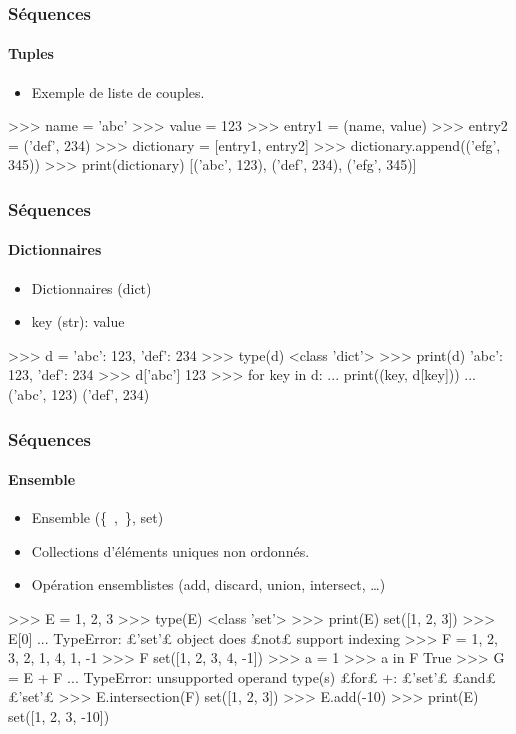 \begin{frame}[fragile]
\frametitle{Séquences}
\framesubtitle{Tuples}
\begin{itemize}
 \item Exemple de liste de couples. 
\end{itemize}
\begin{pythonConsole}
>>> name = 'abc'
>>> value = 123
>>> entry1 = (name, value)
>>> entry2 = ('def', 234)
>>> dictionary = [entry1, entry2]
>>> dictionary.append(('efg', 345))
>>> print(dictionary)
[('abc', 123), ('def', 234), ('efg', 345)]
\end{pythonConsole}
\end{frame}
\begin{frame}[fragile]
\frametitle{Séquences}
\framesubtitle{Dictionnaires}
\begin{itemize}
 \item Dictionnaires (dict) 
 \item key (str): value 
\end{itemize}
\begin{pythonConsole}
>>> d = {'abc': 123, 'def': 234}
>>> type(d)
<class 'dict'>
>>> print(d)
{'abc': 123, 'def': 234}
>>> d['abc']
123
>>> for key in d: 
...  print((key, d[key]))
... 
('abc', 123)
('def', 234)
\end{pythonConsole}
\end{frame}
\begin{frame}[fragile]
\frametitle{Séquences}
\framesubtitle{Ensemble}
\begin{itemize}
 \item Ensemble (\{\ ,\ \}, set) 
 \item Collections d'éléments uniques non ordonnés.
 \item Opération ensemblistes (add, discard, union, intersect, \dots)
\end{itemize}
\begin{pythonConsole}
>>> E = {1, 2, 3}
>>> type(E)
<class 'set'>
>>> print(E)
set([1, 2, 3])
>>> E[0]
... TypeError: £'set'£ object does £not£ support indexing
>>> F = {1, 2, 3, 2, 1, 4, 1, -1}
>>> F
set([1, 2, 3, 4, -1])
>>> a = 1
>>> a in F
True
>>> G = E + F
... TypeError: unsupported operand type(s) £for£ +: £'set'£ £and£ £'set'£
>>> E.intersection(F)
set([1, 2, 3]) 
>>> E.add(-10)
>>> print(E)
set([1, 2, 3, -10])
\end{pythonConsole}
\end{frame}
